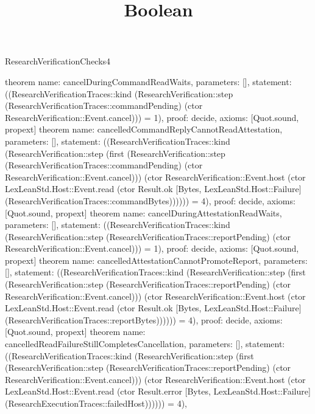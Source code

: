 \begin{lexlean}{ResearchVerificationChecks4}
\title{Boolean}
\begin{semanticmodule}
theorem{
  name: cancelDuringCommandReadWaits,
  parameters: [],
  statement: ((ResearchVerificationTraces::kind (ResearchVerification::step (ResearchVerificationTraces::commandPending) (ctor ResearchVerification::Event.cancel))) = 1),
  proof: decide{},
  axioms: [Quot.sound, propext]
}
theorem{
  name: cancelledCommandReplyCannotReadAttestation,
  parameters: [],
  statement: ((ResearchVerificationTraces::kind (ResearchVerification::step (first (ResearchVerification::step (ResearchVerificationTraces::commandPending) (ctor ResearchVerification::Event.cancel))) (ctor ResearchVerification::Event.host (ctor LexLeanStd.Host::Event.read (ctor Result.ok [Bytes, LexLeanStd.Host::Failure] (ResearchVerificationTraces::commandBytes)))))) = 4),
  proof: decide{},
  axioms: [Quot.sound, propext]
}
theorem{
  name: cancelDuringAttestationReadWaits,
  parameters: [],
  statement: ((ResearchVerificationTraces::kind (ResearchVerification::step (ResearchVerificationTraces::reportPending) (ctor ResearchVerification::Event.cancel))) = 1),
  proof: decide{},
  axioms: [Quot.sound, propext]
}
theorem{
  name: cancelledAttestationCannotPromoteReport,
  parameters: [],
  statement: ((ResearchVerificationTraces::kind (ResearchVerification::step (first (ResearchVerification::step (ResearchVerificationTraces::reportPending) (ctor ResearchVerification::Event.cancel))) (ctor ResearchVerification::Event.host (ctor LexLeanStd.Host::Event.read (ctor Result.ok [Bytes, LexLeanStd.Host::Failure] (ResearchVerificationTraces::reportBytes)))))) = 4),
  proof: decide{},
  axioms: [Quot.sound, propext]
}
theorem{
  name: cancelledReadFailureStillCompletesCancellation,
  parameters: [],
  statement: ((ResearchVerificationTraces::kind (ResearchVerification::step (first (ResearchVerification::step (ResearchVerificationTraces::reportPending) (ctor ResearchVerification::Event.cancel))) (ctor ResearchVerification::Event.host (ctor LexLeanStd.Host::Event.read (ctor Result.error [Bytes, LexLeanStd.Host::Failure] (ResearchExecutionTraces::failedHost)))))) = 4),
}
\end{semanticmodule}
\end{lexlean}
